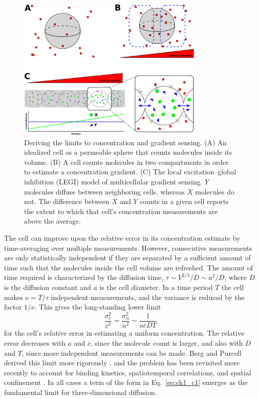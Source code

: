\begin{figure}[ht]
    \centering
        \includegraphics[width=0.8\textwidth]{../fig/ch1_fig2.pdf}
    \caption{Deriving the limits to concentration and gradient sensing.
    (A) An idealized cell as a permeable sphere that counts molecules inside its volume.
    (B) A cell counts molecules in two compartments in order to estimate a concentration gradient.
    (C) The local excitation--global inhibition (LEGI) model of multicellular gradient sensing. $Y$ molecules diffuse between neighboring cells, whereas $X$ molecules do not. The difference between $X$ and $Y$ counts in a given cell reports the extent to which that cell's concentration measurements are above the average.}
    \label{fig:ch1_2}
\end{figure}

The cell can improve upon the relative error in its concentration estimate by time-averaging over multiple measurements. However, consecutive measurements are only statistically independent if they are separated by a sufficient amount of time such that the molecules inside the cell volume are refreshed. The amount of time required is characterized by the diffusion time, $\tau \sim V^{2/3}/D \sim a^2/D$, where $D$ is the diffusion constant and $a$ is the cell diameter. In a time period $T$ the cell makes $\nu = T/\tau$ independent measurements, and the variance is reduced by the factor $1/\nu$. This gives the long-standing lower limit
\begin{equation} \label{eq:ch1_c1}
\frac{ \sigma_c^2 }{\bar{c}^2} = \frac{ \sigma_n^2}{\bar{n}^2} \sim \frac{1}{a\bar{c}DT}
\end{equation}
for the cell's relative error in estimating a uniform concentration.
The relative error decreases with $a$ and $\bar{c}$, since the molecule count is larger, and also with $D$ and $T$, since more independent measurements can be made. Berg and Purcell derived this limit more rigorously \cite{berg1977physics}, and the problem has been revisited more recently to account for binding kinetics, spatiotemporal correlations, and spatial confinement \cite{bialek2005physical, kaizu2014berg, bicknell2015limits}.
In all cases a term of the form in Eq.\ \ref{eq:ch1_c1} emerges as the fundamental limit for three-dimensional diffusion.

